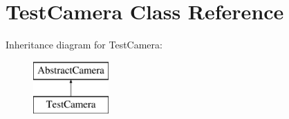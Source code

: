 \hypertarget{class_test_camera}{\section{Test\-Camera Class Reference}
\label{class_test_camera}
}
Inheritance diagram for Test\-Camera\-:\begin{figure}[H]
\begin{center}
\leavevmode
\includegraphics[height=2.000000cm]{class_test_camera}
\end{center}
\end{figure}
